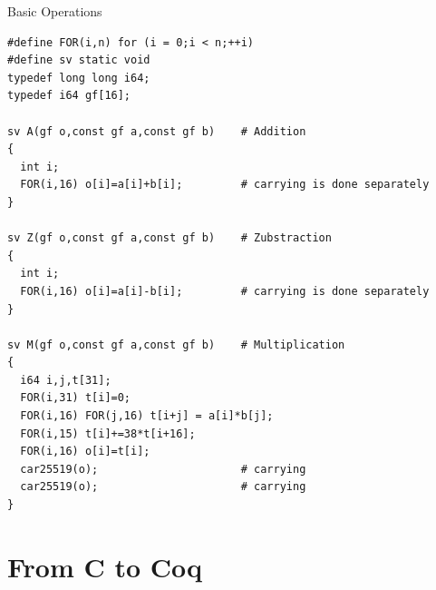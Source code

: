 \documentclass[8pt]{beamer}
\begin{document}
%
%
\begin{frame}[fragile]{Basic Operations}
  \begin{center}

\begin{lstlisting}[language=cnacl, caption=Basic Operations, label=cod:languageC31]
#define FOR(i,n) for (i = 0;i < n;++i)
#define sv static void
typedef long long i64;
typedef i64 gf[16];

sv A(gf o,const gf a,const gf b)    # Addition
{
  int i;
  FOR(i,16) o[i]=a[i]+b[i];         # carrying is done separately
}

sv Z(gf o,const gf a,const gf b)    # Zubstraction
{
  int i;
  FOR(i,16) o[i]=a[i]-b[i];         # carrying is done separately
}

sv M(gf o,const gf a,const gf b)    # Multiplication
{
  i64 i,j,t[31];
  FOR(i,31) t[i]=0;
  FOR(i,16) FOR(j,16) t[i+j] = a[i]*b[j];
  FOR(i,15) t[i]+=38*t[i+16];
  FOR(i,16) o[i]=t[i];
  car25519(o);                      # carrying
  car25519(o);                      # carrying
}
\end{lstlisting}

  \end{center}
\end{frame}

\section{From C to Coq}

%
%
\end{document}
